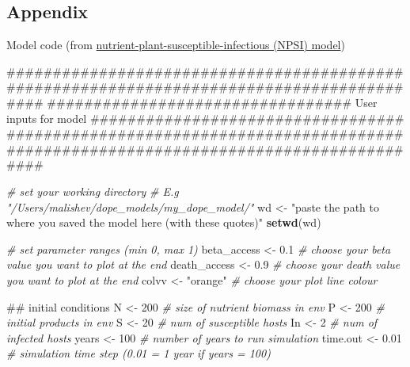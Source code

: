 \documentclass[10,portrait]{article}
\newenvironment{Shaded}{\begin{snugshade}}{\end{snugshade}}
\newcommand{\KeywordTok}[1]{\textcolor[rgb]{0.13,0.29,0.53}{\textbf{#1}}}
\newcommand{\DecValTok}[1]{\textcolor[rgb]{0.00,0.00,0.81}{#1}}
\newcommand{\FloatTok}[1]{\textcolor[rgb]{0.00,0.00,0.81}{#1}}
\newcommand{\StringTok}[1]{\textcolor[rgb]{0.31,0.60,0.02}{#1}}
\newcommand{\CommentTok}[1]{\textcolor[rgb]{0.56,0.35,0.01}{\textit{#1}}}
\newcommand{\NormalTok}[1]{#1}
\begin{document}
\subsection{Appendix}\label{appendix}

Model code (from
\href{https://github.com/darwinanddavis/LECWorkingGroup}{nutrient-plant-susceptible-infectious
(NPSI) model})

\begin{Shaded}
\begin{Highlighting}[]
\NormalTok{##########################################################################################}
\NormalTok{################################# User inputs for model ##################################}
\NormalTok{##########################################################################################}

\CommentTok{# set your working directory }
\CommentTok{# E.g "/Users/malishev/dope_models/my_dope_model/"}
\NormalTok{wd <-}\StringTok{ "paste the path to where you saved the model here (with these quotes)"}
\KeywordTok{setwd}\NormalTok{(wd)}

\CommentTok{# set parameter ranges (min 0, max 1)}
\NormalTok{beta_access <-}\StringTok{ }\FloatTok{0.1} \CommentTok{# choose your beta value you want to plot at the end}
\NormalTok{death_access <-}\StringTok{ }\FloatTok{0.9} \CommentTok{# choose your death value you want to plot at the end}
\NormalTok{colvv <-}\StringTok{ "orange"} \CommentTok{# choose your plot line colour}

\NormalTok{## initial conditions}
\NormalTok{N <-}\StringTok{ }\DecValTok{200} \CommentTok{# size of nutrient biomass in env }
\NormalTok{P <-}\StringTok{ }\DecValTok{200} \CommentTok{# initial products in env}
\NormalTok{S <-}\StringTok{ }\DecValTok{20} \CommentTok{# num of susceptible hosts}
\NormalTok{In <-}\StringTok{ }\DecValTok{2} \CommentTok{# num of infected hosts }
\NormalTok{years <-}\StringTok{ }\DecValTok{100} \CommentTok{# number of years to run simulation}
\NormalTok{time.out <-}\StringTok{ }\FloatTok{0.01} \CommentTok{# simulation time step (0.01 = 1 year if years = 100) }
\end{Highlighting}
\end{Shaded}
\end{document}
